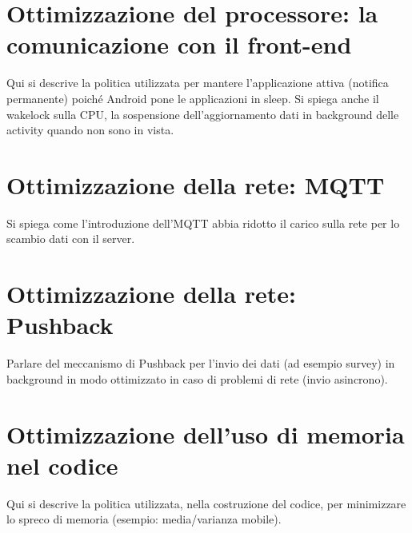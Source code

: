\documentclass[a4paper,10pt]{memoir}
\begin{document}
\chapter{Ottimizzazione del processore: la comunicazione con il front-end}

Qui si descrive la politica utilizzata per mantere l'applicazione attiva (notifica permanente) poiché Android pone le applicazioni in sleep. Si spiega anche il wakelock sulla CPU, la sospensione dell'aggiornamento dati in background delle activity quando non sono in vista.

\chapter{Ottimizzazione della rete: MQTT}

Si spiega come l'introduzione dell'MQTT abbia ridotto il carico sulla rete per lo scambio dati con il server.

\chapter{Ottimizzazione della rete: Pushback}

Parlare del meccanismo di Pushback per l'invio dei dati (ad esempio survey) in background in modo ottimizzato in caso di problemi di rete (invio asincrono).

\chapter{Ottimizzazione dell'uso di memoria nel codice}

Qui si descrive la politica utilizzata, nella costruzione del codice, per minimizzare lo spreco di memoria (esempio: media/varianza mobile).

\pagebreak
\end{document}
